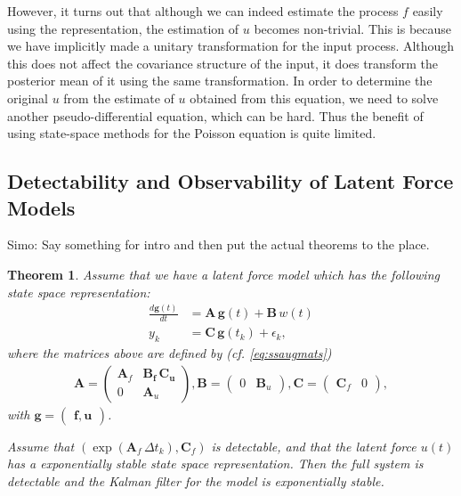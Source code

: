 \documentclass[journal]{IEEEtran}
\newtheorem{theorem}{Theorem}[section]
\newcommand{\simo}[1]{{\color{red}#1}}
\begin{document}
However, it turns out that although we can indeed estimate the process $f$ easily using the representation, the estimation of $u$ becomes non-trivial. This is because we have implicitly made a unitary transformation for the input process. Although this does not affect the covariance structure of the input, it does transform the posterior mean of it using the same transformation. In order to determine the original $u$ from the estimate of $u$ obtained from this equation, we need to solve another pseudo-differential equation, which can be hard. Thus the benefit of using state-space methods for the Poisson equation is quite limited. 

\subsection{Detectability and Observability of Latent Force Models}

\simo{Simo: Say something for intro and then put the actual theorems to the place.}

\begin{theorem}
  Assume that we have a latent force model which has the following state space representation:
\begin{equation}
\begin{split}
  \frac{d\mathbf{g}(t)}{dt}
  &= \mathbf{A} \, \mathbf{g}(t)
  + \mathbf{B} \, w(t) \\
  y_k &= \mathbf{C} \, \mathbf{g}(t_k) + \epsilon_k,
\end{split}
\end{equation}
%
where the matrices above are defined by (cf. \eqref{eq:ssaugmats})
%
\begin{equation}
\begin{split}
  \mathbf{A}
  = \begin{pmatrix}
	\mathbf{A}_f & \mathbf{\mathbf{B}_f \, \mathbf{C}_u} \\
	0 & \mathbf{A}_u
  \end{pmatrix}, 
  \mathbf{B}
  = \begin{pmatrix}
	0 & \mathbf{B}_u
  \end{pmatrix}, 
  \mathbf{C}
  = \begin{pmatrix}
	\mathbf{C}_f & 0
  \end{pmatrix},
\end{split}
\end{equation}
%
with $\mathbf{g} = \begin{pmatrix} \mathbf{f}, \mathbf{u} \end{pmatrix}$. 

Assume that $(\exp(\mathbf{A}_f \, \Delta t_k),\mathbf{C}_f)$ is detectable, and that the latent force $u(t)$ has a exponentially stable state space representation. Then the full system is \emph{detectable} and the Kalman filter for the model is exponentially stable.
\end{theorem}
\end{document}
